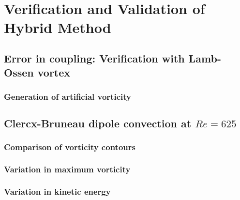 \chapter{Verification and Validation of Hybrid Method}

%
%
%
%
\section{Error in coupling: Verification with Lamb-Ossen vortex}

\subsection{Generation of artificial vorticity}


\section{Clercx-Bruneau dipole convection at $Re=625$}

\subsection{Comparison of vorticity contours}

\subsection{Variation in maximum vorticity}

\subsection{Variation in kinetic energy}

